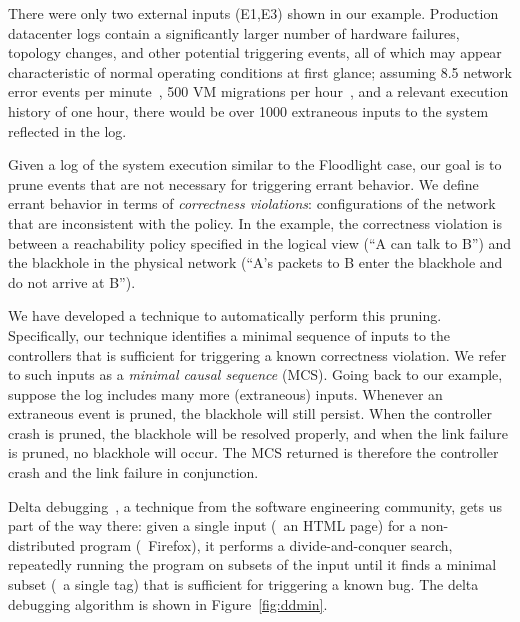 There were only two external inputs (E1,E3) shown in our example.
Production datacenter logs contain
a significantly larger number of hardware failures, topology changes,
and other potential triggering events,
all of which may appear characteristic of normal operating
conditions at first glance; assuming 8.5 network error events per
minute~\cite{Greenberg:2009:VSF:1592568.1592576}, 500 VM migrations per
hour~\cite{Soundararajan:2010:CBS:1899928.1899941}, and a relevant execution
history of one hour, there would be over 1000 extraneous inputs to the system
reflected in the log.

Given a log of the system execution similar to the Floodlight case,
our goal is to prune events that are not
necessary for triggering errant behavior. We define errant behavior in terms
of {\em correctness violations}:
configurations of the network that are inconsistent
with the policy. In the example, the correctness violation is between a
reachability policy specified in the logical view (``A can talk to B'')
and the blackhole in the physical network (``A's packets to B enter the
blackhole and do not arrive at B'').

We have developed a technique to automatically perform this pruning.
Specifically, our technique identifies a minimal sequence of inputs
to the controllers that is sufficient for triggering a known correctness violation. We
refer to such inputs as a {\em minimal causal sequence} (MCS). Going back to our example,
suppose the log includes many more (extraneous) inputs. Whenever an
extraneous event is pruned, the blackhole will still persist. When
the controller crash is pruned, the blackhole will be resolved properly, and
when the link failure is pruned, no blackhole will occur. The MCS returned
is therefore the controller crash and the link failure in conjunction.

Delta debugging~\cite{Zeller:2002:SIF:506201.506206}, a technique from the
software engineering community, gets us part of the way
there: given a single input (\eg~an HTML page)
for a non-distributed program (\eg~Firefox), it performs a divide-and-conquer
search, repeatedly running the program on subsets of the input
until it finds a minimal subset (\eg~a single tag) that is sufficient
for triggering a known bug. The delta debugging algorithm is shown in
Figure~\ref{fig:ddmin}.

